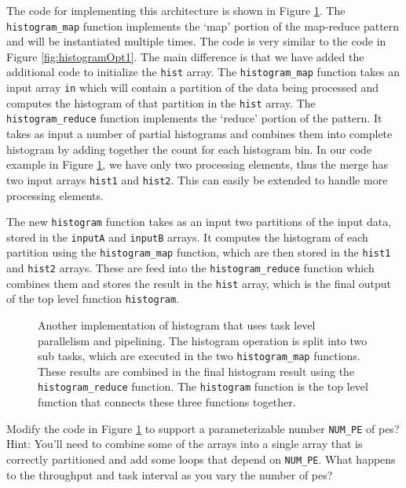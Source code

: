 The code for implementing this architecture is shown in Figure \ref{fig:histogram_parallel}. The \lstinline{histogram_map} function implements the `map' portion of the map-reduce pattern and will be instantiated multiple times. The code is very similar to the code in Figure \ref{fig:histogramOpt1}. The main difference is that we have added the additional code to initialize the \lstinline|hist| array.  The \lstinline{histogram_map} function takes an input array \lstinline{in} which will contain a partition of the data being processed and computes the histogram of that partition in the \lstinline|hist| array.   The \lstinline{histogram_reduce} function implements the `reduce' portion of the pattern.  It takes as input a number of partial histograms and combines them into complete histogram by adding together the count for each histogram bin.  In our code example in Figure \ref{fig:histogram_parallel}, we have only two processing elements, thus the merge has two input arrays \lstinline{hist1} and \lstinline{hist2}. This can easily be extended to handle more processing elements.

The new \lstinline{histogram} function takes as an input two partitions of the input data, stored in the \lstinline{inputA} and \lstinline{inputB} arrays.  It computes the histogram of each partition using the \lstinline {histogram_map} function, which are then stored in the \lstinline{hist1} and \lstinline{hist2} arrays. These are feed into the \lstinline{histogram_reduce} function which combines them and stores the result in the \lstinline{hist} array, which is the final output of the top level function \lstinline{histogram}. 

\begin{figure}

\caption{ Another implementation of histogram that uses task level parallelism and pipelining. The histogram operation is split into two sub tasks, which are executed in the two \lstinline{histogram_map} functions. These results are combined in the final histogram result using the \lstinline{histogram_reduce} function. The \lstinline{histogram} function is the top level function that connects these three functions together. }
\label{fig:histogram_parallel}
\end{figure}

\begin{exercise}
Modify the code in Figure \ref{fig:histogram_parallel} to support a parameterizable number \lstinline|NUM_PE| of \glspl{pe}? Hint: You'll need to combine some of the arrays into a single array that is correctly partitioned and add some loops that depend on \lstinline|NUM_PE|.  What happens to the throughput and task interval as you vary the number of \glspl{pe}? 
\end{exercise}

